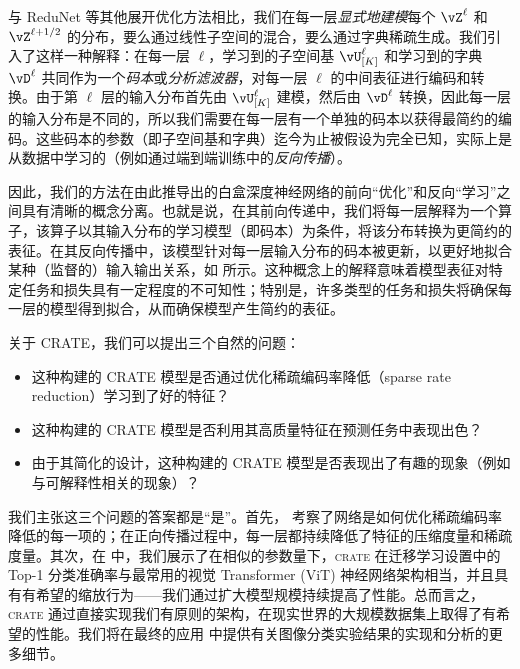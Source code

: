 \documentclass[../../book-main_zh.tex]{subfiles}
\begin{document}
\begin{remark}\label{sub:forward_backward}
    与 ReduNet \cite{chan2021redunet} 等其他展开优化方法相比，我们在每一层\textit{显式地建模}每个 $\vZ^\ell$ 和 $\vZ^{\ell + 1/2}$ 的分布，要么通过线性子空间的混合，要么通过字典稀疏生成。我们引入了这样一种解释：在每一层 \(\ell\)，学习到的子空间基 \(\vU_{[K]}^{\ell}\) 和学习到的字典 \(\vD^{\ell}\) 共同作为一个\textit{码本}或\textit{分析滤波器}，对每一层 \(\ell\) 的中间表征进行编码和转换。由于第 \(\ell\) 层的输入分布首先由 \(\vU_{[K]}^{\ell}\) 建模，然后由 \(\vD^{\ell}\) 转换，因此每一层的输入分布是不同的，所以我们需要在每一层有一个单独的码本以获得最简约的编码。这些码本的参数（即子空间基和字典）迄今为止被假设为完全已知，实际上是从数据中学习的（例如通过端到端训练中的\textit{反向传播}）。

    因此，我们的方法在由此推导出的白盒深度神经网络的前向“优化”和反向“学习”之间具有清晰的概念分离。也就是说，在其前向传递中，我们将每一层解释为一个算子，该算子以其输入分布的学习模型（即码本）为条件，将该分布转换为更简约的表征。在其反向传播中，该模型针对每一层输入分布的码本被更新，以更好地拟合某种（监督的）输入输出关系，如  所示。这种概念上的解释意味着模型表征对特定任务和损失具有一定程度的不可知性；特别是，许多类型的任务和损失将确保每一层的模型得到拟合，从而确保模型产生简约的表征。
\end{remark}

关于 CRATE，我们可以提出三个自然的问题：
\begin{itemize}
    \item 这种构建的 CRATE 模型是否通过优化稀疏编码率降低（sparse rate reduction）学习到了好的特征？
    \item 这种构建的 CRATE 模型是否利用其高质量特征在预测任务中表现出色？
    \item 由于其简化的设计，这种构建的 CRATE 模型是否表现出了有趣的现象（例如与可解释性相关的现象）？
\end{itemize}
我们主张这三个问题的答案都是“是”。首先， 考察了网络是如何优化稀疏编码率降低的每一项的；在正向传播过程中，每一层都持续降低了特征的压缩度量和稀疏度量。其次，在  中，我们展示了在相似的参数量下，\textsc{crate} 在迁移学习设置中的 Top-1 分类准确率与最常用的视觉 Transformer (ViT) \citep{dosovitskiy2020image} 神经网络架构相当，并且具有有希望的缩放行为——我们通过扩大模型规模持续提高了性能。总而言之，\textsc{crate} 通过直接实现我们有原则的架构，在现实世界的大规模数据集上取得了有希望的性能。我们将在最终的应用  中提供有关图像分类实验结果的实现和分析的更多细节。
\end{document}
